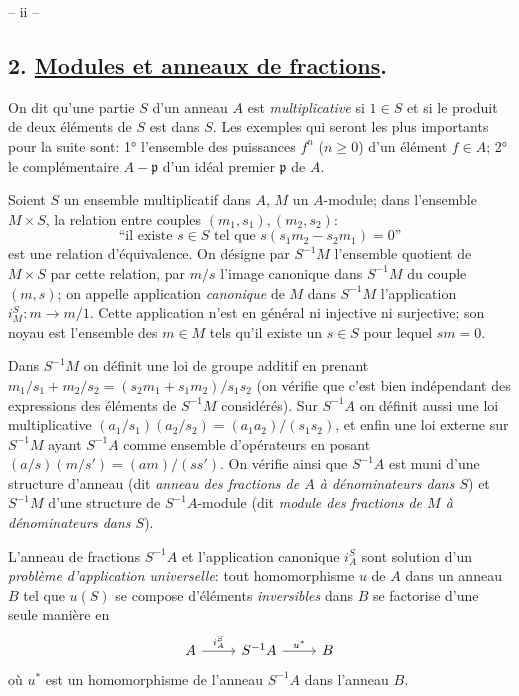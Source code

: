 \newpage


\hfill -- ii --\hfill

\subsection*{2. \underline{Modules et anneaux de fractions}.}

On dit qu'une partie $S$ d'un anneau $A$ est \emph{multiplicative} si $1 \in S$ et si le produit de deux éléments de $S$ est dans $S$. Les exemples qui seront les plus importants pour la suite sont: 1° l'ensemble des puissances $f^n$ ($n \geq 0$) d'un élément $f \in A$; 2° le complémentaire $A - \mathfrak{p}$ d'un idéal premier $\mathfrak{p}$ de $A$.

Soient $S$ un ensemble multiplicatif dans $A$, $M$ un $A$-module; dans l'ensemble $M \times S$, la relation entre couples $(m_1, s_1), (m_2, s_2)$:
$$\text{``il existe } s \in S \text{ tel que } s(s_1 m_2 - s_2 m_1) = 0\text{''}$$
est une relation d'équivalence. On désigne par $S^{-1}M$ l'ensemble quotient de $M \times S$ par cette relation, par $m/s$ l'image canonique dans $S^{-1}M$ du couple $(m,s)$; on appelle application \emph{canonique} de $M$ dans $S^{-1}M$ l'application $i_M^S: m \to m/1$. Cette application n'est en général ni injective ni surjective; son noyau est l'ensemble des $m \in M$ tels qu'il existe un $s \in S$ pour lequel $sm = 0$.

Dans $S^{-1}M$ on définit une loi de groupe additif en prenant $m_1/s_1 + m_2/s_2 = (s_2 m_1 + s_1 m_2)/s_1 s_2$ (on vérifie que c'est bien indépendant des expressions des éléments de $S^{-1}M$ considérés). Sur $S^{-1}A$ on définit aussi une loi multiplicative $(a_1/s_1)(a_2/s_2) = (a_1 a_2)/(s_1 s_2)$, et enfin une loi externe sur $S^{-1}M$ ayant $S^{-1}A$ comme ensemble d'opérateurs en posant $(a/s)(m/s') = (am)/(ss')$. On vérifie ainsi que $S^{-1}A$ est muni d'une structure d'anneau (dit \emph{anneau des fractions de $A$ à dénominateurs dans $S$}) et $S^{-1}M$ d'une structure de $S^{-1}A$-module (dit \emph{module des fractions de $M$ à dénominateurs dans $S$}).

L'anneau de fractions $S^{-1}A$ et l'application canonique $i_A^S$ sont solution d'un \emph{problème d'application universelle}: tout homomorphisme $u$ de $A$ dans un anneau $B$ tel que $u(S)$ se compose d'éléments \emph{inversibles} dans $B$ se factorise d'une seule manière en
$$\begin{tikzcd}
A \arrow[r, "i_A^S"] & S^{-1}A \arrow[r, "u^*"] & B
\end{tikzcd}$$
où $u^*$ est un homomorphisme de l'anneau $S^{-1}A$ dans l'anneau $B$.


